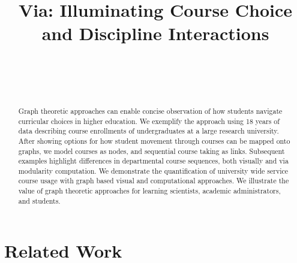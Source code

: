 \documentclass{sigchi}
\def\plaintitle{Via: Illuminating Course Choice and Discipline Interactions}
\begin{document}
\title{\plaintitle}

\author{%
  \\
  \\
  \\
}

\maketitle

\begin{abstract}
Graph theoretic approaches can enable concise observation of how students navigate curricular choices in higher education. We exemplify the approach using 18 years of data describing course enrollments of undergraduates at a large research university. After showing options for how student movement through courses can be mapped onto graphs, we model courses as nodes, and sequential course taking as links. Subsequent examples highlight differences in departmental course sequences, both visually and via modularity computation. We demonstrate the quantification of university wide service course usage with graph based visual and computational approaches. We illustrate the value of graph theoretic approaches for learning scientists, academic administrators, and students.
 \end{abstract}






\section{Related Work}
\end{document}
